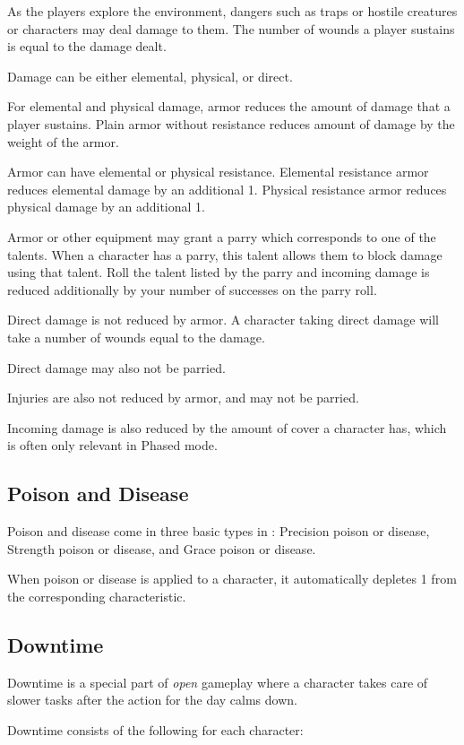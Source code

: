 As the players explore the environment, dangers such as traps or hostile creatures or characters may deal damage to them. The number of wounds a player sustains is equal to the damage dealt. 

Damage can be either elemental, physical, or direct.

For elemental and physical damage, armor reduces the amount of damage that a player sustains. Plain armor without resistance reduces amount of damage by the weight of the armor. 

Armor can have elemental or physical resistance. Elemental resistance armor reduces elemental damage by an additional 1. Physical resistance armor reduces physical damage by an additional 1.

Armor or other equipment may grant a parry which corresponds to one of the talents. When a character has a parry, this talent allows them to block damage using that talent. Roll the talent listed by the parry and incoming damage is reduced additionally by your number of successes on the parry roll.

Direct damage is not reduced by armor. A character taking direct damage will take a number of wounds equal to the damage.

Direct damage may also not be parried.

Injuries are also not reduced by armor, and may not be parried.

Incoming damage is also reduced by the amount of cover a character has, which is often only relevant in Phased mode.

\subsection{Poison and Disease}

Poison and disease come in three basic types in \GammaRP: Precision poison or disease, Strength poison or disease, and Grace poison or disease.

When poison or disease is applied to a character, it automatically depletes 1 from the corresponding characteristic.

\subsection{Downtime}
Downtime is a special part of \emph{open} gameplay where a character takes care of slower tasks after the action for the day calms down.

Downtime consists of the following for each character:

